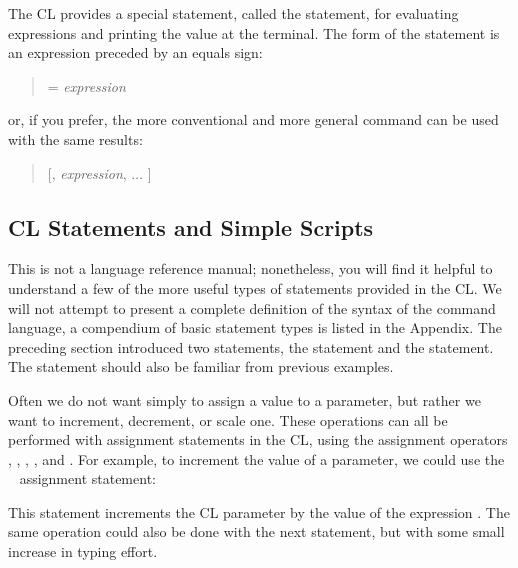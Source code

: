 The CL provides a special statement, called the 
statement, for evaluating expressions
and printing the value at the terminal.  The form of the statement
is an expression preceded by an equals sign:

\begin{quotation}\noindent
= {\it expression}
\end{quotation}

\noindent
or, if you prefer, the more conventional and more general 
command can be used with the same results:

\begin{quotation}\noindent
{}  [, {\it expression},
       $\ldots$ ] \usertype{)}
\end{quotation}

\subsection{CL Statements and Simple Scripts}

This is not a language reference manual; nonetheless, 
you will find it helpful to understand a few of the more useful 
types of statements provided in the CL.
We will not attempt to present a
complete definition of the syntax of the command language,
a compendium of basic statement types is listed in the Appendix.
The preceding section introduced two statements,
the  statement and the  statement.
The  statement should also be familiar from
previous examples.

Often we do not want simply to assign a value to a parameter,
but rather we want to increment, decrement, or scale one.
These operations can all be performed with assignment statements
in the CL, using the assignment operators \pluseq, \minuseq, \timeseq,
\diveq, and \concateq. For example, to increment the 
value of a parameter, we could use the \pluseq~ assignment statement:

\begin{quotation}\noindent
{} 
\end{quotation}

This statement increments the CL parameter 
by the value of the expression .  The same 
operation could also be done with the next statement, but with some
small increase in typing effort.

\begin{quotation}\noindent
{} 
\end{quotation}

